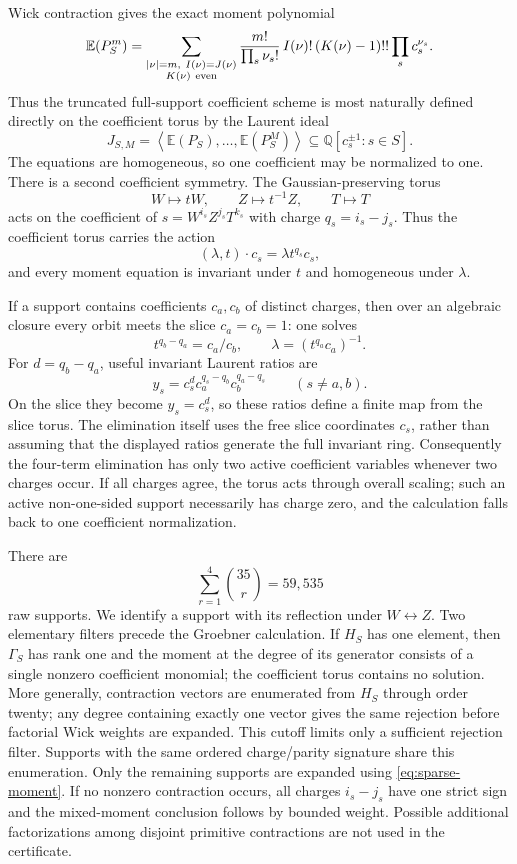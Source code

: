 \documentclass[11pt]{article}
\newcommand{\E}{\mathbb E}
\begin{document}
Wick contraction gives the exact moment polynomial
\begin{equation}\label{eq:sparse-moment}
 \E(P_S^m)
 =
 \sum_{\substack{|\nu|=m,\ I(\nu)=J(\nu)\\K(\nu)\ {\rm even}}}
 \frac{m!}{\prod_s\nu_s!}\,
 I(\nu)!\,(K(\nu)-1)!!\prod_sc_s^{\nu_s}.
\end{equation}
Thus the truncated full-support coefficient scheme is most naturally
defined directly on the coefficient torus by the Laurent ideal
\begin{equation}\label{eq:laurent-ideal}
 J_{S,M}
 =
 \left\langle\E(P_S),\ldots,\E(P_S^M)\right\rangle
 \subseteq \mathbb Q[c_s^{\pm1}:s\in S].
\end{equation}
The equations are homogeneous, so one coefficient may be normalized to
one.  There is a second coefficient symmetry.  The
Gaussian-preserving torus
\[
  W\longmapsto tW,\qquad Z\longmapsto t^{-1}Z,\qquad T\longmapsto T
\]
acts on the coefficient of \(s=W^{i_s}Z^{j_s}T^{k_s}\) with charge
\(q_s=i_s-j_s\).  Thus the coefficient torus carries the action
\[
  (\lambda,t)\cdot c_s=\lambda t^{q_s}c_s,
\]
and every moment equation is invariant under \(t\) and homogeneous under
\(\lambda\).

If a support contains coefficients \(c_a,c_b\) of distinct charges, then
over an algebraic closure every orbit meets the slice \(c_a=c_b=1\):
one solves
\[
  t^{q_b-q_a}=c_a/c_b,\qquad
  \lambda=(t^{q_a}c_a)^{-1}.
\]
For \(d=q_b-q_a\), useful invariant Laurent ratios are
\[
  y_s=c_s^d c_a^{q_s-q_b}c_b^{q_a-q_s}
  \qquad(s\neq a,b).
\]
On the slice they become \(y_s=c_s^d\), so these ratios define a finite
map from the slice torus.  The elimination itself uses the free slice
coordinates \(c_s\), rather than assuming that the displayed ratios
generate the full invariant ring.  Consequently the four-term elimination has
only two active coefficient variables whenever two charges occur.  If all
charges agree, the torus acts through overall scaling; such an active
non-one-sided support necessarily has charge zero, and the calculation
falls back to one coefficient normalization.

There are
\[
 \sum_{r=1}^4\binom{35}{r}=59{,}535
\]
raw supports.  We identify a support with its reflection under
\(W\leftrightarrow Z\).  Two elementary filters precede the Groebner
calculation.  If \(H_S\) has one element, then \(\Gamma_S\) has rank one
and the moment at the degree of its generator consists of a single
nonzero coefficient monomial; the coefficient torus contains no solution.
More generally, contraction vectors are enumerated from \(H_S\) through
order twenty; any degree containing exactly one vector gives the same
rejection before factorial Wick weights are expanded.  This cutoff limits
only a sufficient rejection filter.  Supports with
the same ordered charge/parity signature share this enumeration.  Only
the remaining supports are expanded using \eqref{eq:sparse-moment}.  If no nonzero
contraction occurs, all charges \(i_s-j_s\) have one strict sign and the
mixed-moment conclusion follows by bounded weight.  Possible additional
factorizations among disjoint primitive contractions are not used in the
certificate.
\end{document}

